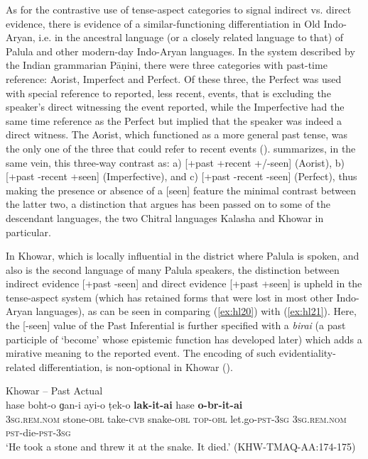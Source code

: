 \documentclass[output=paper]{langsci/langscibook}
\begin{document}
As for the contrastive use of tense-aspect categories to signal indirect vs. direct evidence, there is evidence of a similar-functioning differentiation in Old Indo-Aryan, i.e. in the ancestral language (or a closely related language to that) of Palula and other modern-day Indo-Aryan languages. In the system described by the Indian grammarian Pāṇini, there were three categories with past-time reference: Aorist, Imperfect and Perfect. Of these three, the Perfect was used with special reference to reported, less recent, events, that is excluding the speaker’s direct witnessing the event reported, while the Imperfective had the same time reference as the Perfect but implied that the speaker was indeed a direct witness. The Aorist, which functioned as a more general past tense, was the only one of the three that could refer to recent events (\citealt[235]{Cardona2002}). \cite[62]{Deshpande1981} summarizes, in the same vein, this three-way contrast as: a) [+past +recent +/-seen] (Aorist), b) [+past -recent +seen] (Imperfective), and c) [+past -recent -seen] (Perfect), thus making the presence or absence of a [seen] feature the minimal contrast between the latter two, a distinction that \cite{Bashir2006} argues has been passed on to some of the descendant languages, the two Chitral languages Kalasha and Khowar in particular.  

In Khowar, which is locally influential in the district where Palula is spoken, and also is the second language of many Palula speakers, the distinction between indirect evidence [+past -seen] and direct evidence [+past +seen] is upheld in the tense-aspect system (which has retained forms that were lost in most other Indo-Aryan languages), as can be seen in comparing ‎(\ref{ex:hl20}) with ‎(\ref{ex:hl21}). Here, the [-seen] value of the Past Inferential is further specified with a \textit{birai} (a past participle of ‘become’ whose epistemic function has developed later) which adds a mirative meaning to the reported event. The encoding of such evidentiality-related differentiation, is non-optional in Khowar (\citealt[221–222]{Bashir2007}).

\newpage
\begin{exe}
	\ex Khowar – Past Actual \label{ex:hl20}\\
	\gll hase boht-o ɡan-i ayi-o ṭek-o \textbf{lak-it-ai} hase \textbf{o-br-it-ai}\\
	3\textsc{sg}.\textsc{rem}.\textsc{nom} stone-\textsc{obl} take-\textsc{cvb} snake-\textsc{obl} \textsc{top}-\textsc{obl} let.go-\textsc{pst}-3\textsc{sg} 3\textsc{sg}.\textsc{rem}.\textsc{nom} \textsc{pst}-die-\textsc{pst}-3\textsc{sg}\\
	 ‘He took a stone and threw it at the snake. It died.’ (KHW-TMAQ-AA:174-175)
\end{exe}
\end{document}
